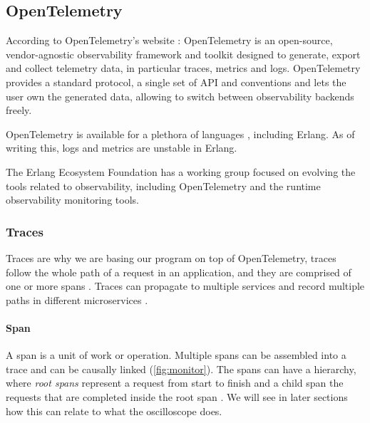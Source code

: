 \subsection{OpenTelemetry}
    According to OpenTelemetry's website \cite{otel-o}: OpenTelemetry is an open-source, vendor-agnostic observability framework and toolkit designed to generate, export and collect telemetry data, in particular traces, metrics and logs. OpenTelemetry provides a standard protocol, a single set of API and conventions and lets the user own the generated data, allowing to switch between observability backends freely.
   
   OpenTelemetry is available for a plethora of languages \cite{otel-lang}, including Erlang. As of writing this, logs and metrics are unstable in Erlang. \cite{otel-in}
     
    The Erlang Ecosystem Foundation has a working group focused on evolving the tools related to observability, including OpenTelemetry and the runtime observability monitoring tools. \cite{obs-group} 
    
    \subsubsection{Traces}
        Traces are why we are basing our program on top of OpenTelemetry, traces follow the whole path of a request in an application, and they are comprised of one or more spans \cite{otel-t}. Traces can propagate to multiple services and record multiple paths in different microservices \cite{otel-dt}. 
        
        \paragraph{Span} A span is a unit of work or operation. Multiple spans can be assembled into a trace and can be causally linked (\cref{fig:monitor}). The spans can have a hierarchy, where \textit{root spans} represent a request from start to finish and a child span the requests that are completed inside the root span \cite{otel-dt}. We will see in later sections how this can relate to what the oscilloscope does.

